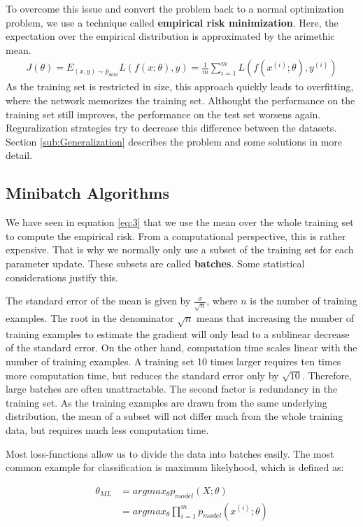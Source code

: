 To overcome this issue and convert the problem back to a normal optimization
problem, we use a technique called \textbf{empirical risk minimization}. Here,
the expectation over the empirical distribution is approximated by the arimethic
mean.
\begin{align}\label{eq:3}
    J(\theta) = E_{(x,y)\sim \hat{p}_{data}} L(f(x;\theta), y) = \frac{1}{m} \sum_{i=1}^m L(f(x^{(i)}; \theta), y^{(i)})
\end{align}
As the training set is restricted in size, this approach quickly leads to
overfitting, where the network memorizes the training set. Althought the
performance on the training set still improves, the performance on the test set
worsens again. Reguralization strategies try to decrease this difference between
the datasets. Section \ref{sub:Generalization} describes the problem and some
solutions in more detail.


\subsection{Minibatch Algorithms}\label{sub:Minibatch}
We have seen in equation \ref{eq:3} that we use the mean over the whole training
set to compute the empirical risk. From a computational perspective, this is
rather expensive. That is why we normally only use a subset of the training set
for each parameter update. These subsets are called \textbf{batches}. Some statistical
considerations justify this.

The standard error of the mean is given by $\frac{\sigma}{\sqrt{n}}$, where $n$
is the number of training examples. The root in the denominator $\sqrt{n}$ means
that increasing the number of training examples to estimate the gradient will
only lead to a sublinear decrease of the standard error. On the other hand,
computation time scales linear with the number of training examples. A training
set 10 times larger requires ten times more computation time, but reduces the
standard error only by $\sqrt{10}$. Therefore, large batches are often
unattractable. The second factor is redundancy in the training set. As the
training examples are drawn from the same underlying distribution, the mean of a
subset will not differ much from the whole training data, but requires much less
computation time.

Most loss-functions allow us to divide the data into batches easily. The most
common example for classification is maximum likelyhood, which is defined as:

\begin{align}
    \theta_{ML}
    & = argmax_{\theta} p_{model}(X; \theta) \\
    & = argmax_{\theta} \prod_{i=1}^m p_{model}(x^{(i)}; \theta)
\end{align}

